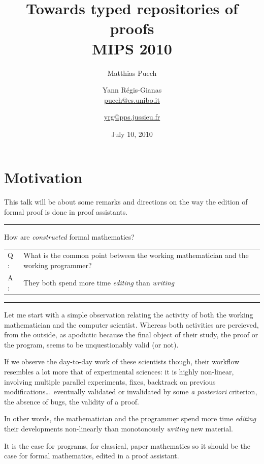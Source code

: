 \documentclass[ignorenonframetext,red]{beamer}
\title{Towards typed repositories of proofs \\[0.6em] 
  \small \textsf{MIPS 2010}}
\date{July 10, 2010}
\author[Matthias Puech \& Yann Régis-Gianas] {
Matthias Puech\inst{1} \and Yann Régis-Gianas\inst{2} \\
{\small \url{puech@cs.unibo.it}} \and {\small \url{yrg@pps.jussieu.fr}}
}
\institute {
  \inst 1 {\small Dept. of Computer Science, University of Bologna} \and
  \inst 2 {\small University Paris 7, CNRS, and INRIA, PPS, team ${\pi}r^2$}
}
\begin{document}
\begin{frame}
  \titlepage
\end{frame}

\section{Motivation}

This talk will be about some remarks and directions on the way the
edition of formal proof is done in proof assistants.

\hrule
\begin{frame}{How are \emph{constructed} formal mathematics?}
  \large
  \begin{tabular}{ll}
    {\Huge Q :} & \parbox{0.8\textwidth}{What is the common point between the working
      mathematician and the working programmer?} \\[2em]
    \pause
    {\Huge A :} & They both spend more time \emph{editing} than \emph{writing}
  \end{tabular}
\end{frame}
\hrule

Let me start with a simple observation relating the activity of both
the working mathematician and the computer scientist. Whereas both
activities are percieved, from the outside, as apodictic because the
final object of their study, the proof or the program, seems to be
unquestionably valid (or not).

If we observe the day-to-day work of these scientists though, their
workflow resembles a lot more that of experimental sciences: it is
highly non-linear, involving multiple parallel experiments, fixes,
backtrack on previous modifications\ldots\ eventually validated or
invalidated by some \emph{a posteriori} criterion, the absence of
bugs, the validity of a proof.

In other words, the mathematician and the programmer spend more time
\emph{editing} their developments non-linearly than monotonously
\emph{writing} new material.

It is the case for programs, for classical, paper mathematics so it
should be the case for formal mathematics, edited in a proof
assistant.
\end{document}
